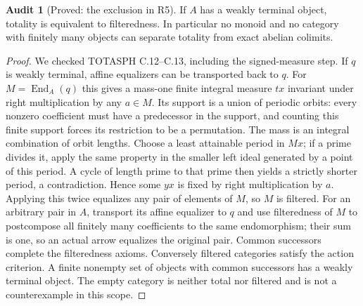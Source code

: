 \documentclass[11pt,a4paper]{article}
\theoremstyle{definition}
\newtheorem{audit}[theorem]{Audit}
\begin{document}
\begin{audit}[Proved: the exclusion in R5]\label{A:R5}
If $A$ has a weakly terminal object, totality is equivalent to filteredness. In particular no monoid and no category with finitely many objects can separate totality from exact abelian colimits.
\end{audit}
\begin{proof}
We checked TOTASPH C.12--C.13, including the signed-measure step. If $q$ is weakly terminal, affine equalizers can be transported back to $q$. For $M=\operatorname{End}_A(q)$ this gives a mass-one finite integral measure $tx$ invariant under right multiplication by any $a\in M$. Its support is a union of periodic orbits: every nonzero coefficient must have a predecessor in the support, and counting this finite support forces its restriction to be a permutation. The mass is an integral combination of orbit lengths. Choose a least attainable period in $Mx$; if a prime divides it, apply the same property in the smaller left ideal generated by a point of this period. A cycle of length prime to that prime then yields a strictly shorter period, a contradiction. Hence some $yx$ is fixed by right multiplication by $a$. Applying this twice equalizes any pair of elements of $M$, so $M$ is filtered. For an arbitrary pair in $A$, transport its affine equalizer to $q$ and use filteredness of $M$ to postcompose all finitely many coefficients to the same endomorphism; their sum is one, so an actual arrow equalizes the original pair. Common successors complete the filteredness axioms. Conversely filtered categories satisfy the action criterion. A finite nonempty set of objects with common successors has a weakly terminal object. The empty category is neither total nor filtered and is not a counterexample in this scope.
\end{proof}
\end{document}
